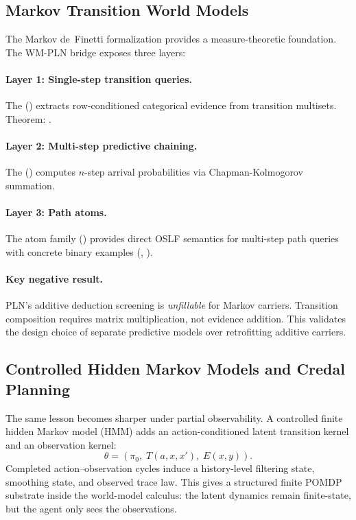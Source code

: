 \documentclass[11pt,openany]{report}
\begin{document}
\subsection{Markov Transition World Models}

The Markov de~Finetti formalization provides a measure-theoretic foundation.
The WM-PLN bridge exposes three layers:

\paragraph{Layer 1: Single-step transition queries.}
The 
()
extracts row-conditioned categorical evidence from transition multisets.
Theorem: .

\paragraph{Layer 2: Multi-step predictive chaining.}
The  ()
computes $n$-step arrival probabilities via Chapman-Kolmogorov summation.

\paragraph{Layer 3: Path atoms.}
The  atom family ()
provides direct OSLF semantics for multi-step path queries with concrete
binary examples (, ).

\paragraph{Key negative result.} PLN's additive deduction screening is
\emph{unfillable} for Markov carriers. Transition composition requires
matrix multiplication, not evidence addition. This validates the design
choice of separate predictive models over retrofitting additive carriers.

\subsection{Controlled Hidden Markov Models and Credal Planning}

The same lesson becomes sharper under partial observability.  A
controlled finite hidden Markov model (HMM) adds an action-conditioned
latent transition kernel and an observation kernel:
\[
  \theta = (\pi_0,\; T(a,x,x'),\; E(x,y)).
\]
Completed action--observation cycles induce a history-level filtering
state, smoothing state, and observed trace law.  This gives a
structured finite POMDP substrate inside the world-model calculus: the
latent dynamics remain finite-state, but the agent only sees the
observations.
\end{document}
